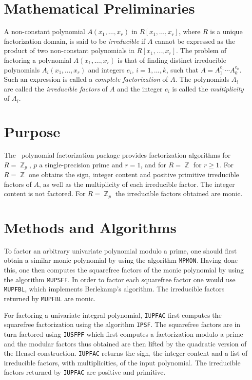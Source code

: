 \section{Mathematical Preliminaries}

A non-constant polynomial $A(x_1,\ldots,x_r)$ in $R[x_1,\ldots,x_r]$,
where $R$ is a unique factorization domain, is said to be {\em
irreducible} if $A$ cannot be expressed as the product of two
non-constant polynomials in $R[x_1,\ldots,x_r]$.
%
The problem of factoring a polynomial $A(x_1,\ldots,x_r)$
is that of finding distinct irreducible polynomials
$A_i(x_1,\ldots,x_r)$ and integers $e_i$, $i = 1,\ldots,k$, such
that $A = A_1^{e_1}\cdots A_k^{e_k}$.
%
Such an expression is called a {\em complete
factorization} of $A$.
%
The polynomials $A_i$ are called the {\em irreducible factors} of $A$
and the integer $e_i$ is called the {\em multiplicity} of $A_i$.

\section{Purpose}
The \saclib\ polynomial factorization package provides factorization
algorithms for $R = \BbbZ_p$, $p$ a single-precision prime and $r =
1$, and for $R = \BbbZ$ for $r \geq 1$. For $R = \BbbZ$ one obtains
the sign, integer content and positive primitive irreducible factors
of $A$, as well as the multiplicity of each irreducible factor. The
integer content is not factored. For $R = \BbbZ_p$ the irreducible
factors obtained are monic.

\section{Methods and Algorithms}

To factor an arbitrary univariate polynomial modulo a prime, one
should first obtain a similar monic polynomial by using the algorithm
{\tt MPMON}.  Having done this, one then computes the squarefree
factors of the monic polynomial by using the algorithm {\tt MUPSFF}.
In order to factor each squarefree factor one would use {\tt MUPFBL},
which implements Berlekamp's algorithm.  The irreducible factors
returned by {\tt MUPFBL} are monic.

For factoring a univariate integral polynomial, {\tt IUPFAC} first
computes the squarefree factorization using the algorithm {\tt IPSF}.
The squarefree factors are in turn factored using {\tt IUSFPF} which
first computes a factorization modulo a prime and the modular factors
thus obtained are then lifted by the quadratic version of the Hensel
construction.  {\tt IUPFAC} returns the sign, the integer content and
a list of irreducible factors, with multiplicities, of the input
polynomial.  The irreducible factors returned by {\tt IUPFAC} are
positive and primitive.

